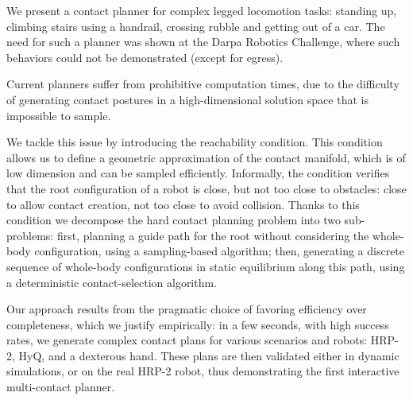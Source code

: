 We present a contact planner for complex legged locomotion tasks: standing up, climbing stairs using a handrail, crossing rubble and getting out of a car. The need for such a planner was shown at the Darpa Robotics Challenge, where such behaviors
could not be demonstrated (except for egress).

Current planners suffer from prohibitive computation times, due to the difficulty
of generating contact postures in a high-dimensional solution space that is impossible to sample.

We tackle this issue by introducing the reachability condition. This condition allows us to define
a geometric approximation of the contact manifold, which is of low dimension and can be sampled efficiently.
Informally, the condition verifies that the root configuration of a robot is close, but not too close to obstacles: close to allow contact creation, not too close to avoid collision. Thanks to this condition we decompose the hard contact planning problem into two
sub-problems: first, planning a guide path for the root without considering the whole-body configuration, using a sampling-based algorithm; then, generating a discrete sequence of whole-body configurations in static equilibrium along this path, using a deterministic contact-selection algorithm. 

Our approach results from the pragmatic choice of favoring efficiency over completeness, which we justify empirically: in a
few seconds, with high success rates, we generate complex contact plans for various scenarios and robots: HRP-2, HyQ, and a dexterous hand. These plans are then validated either in dynamic simulations, or on the real HRP-2 robot, thus demonstrating 
the first interactive multi-contact planner.
